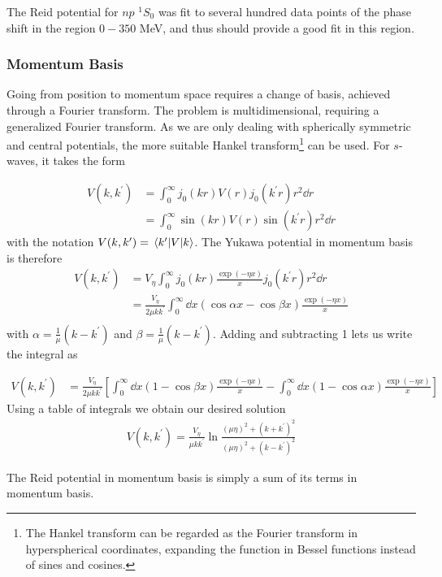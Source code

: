 The Reid potential for \(np\) \(^{1}S_{0}\) was fit to several hundred data points
of the phase shift in the region \(0-350\) MeV, and thus should provide a good
fit in this region\cite{reid}.

\subsubsection{Momentum Basis}

Going from position to momentum space requires a change of basis, achieved
through a Fourier transform. The problem is multidimensional, requiring a
generalized Fourier transform. As we are only dealing with spherically symmetric
 and central potentials, the more suitable Hankel transform\footnote{The Hankel
   transform can be regarded as the Fourier transform in hyperspherical coordinates, expanding the function in
 Bessel functions instead of sines and cosines. } can be used. For
 \(s\)-waves, it takes the form

\newcommand{\kp}{k^{\prime}}
\begin{align*}
  V(k, \kp{}) &= \int_{0}^{\infty}j_{0}(kr)V(r)j_{0}(k^{\prime}r)r^{2}\dd r\\
  &=  \int_{0}^{\infty}\sin(kr)V(r)\sin(k^{\prime}r)r^{2}\dd r
\end{align*}
with the notation \(V(k, \kp{}) = \mel{\kp{}}{V}{k}\). The Yukawa potential in
momentum basis is therefore
\begin{align*}
  V(k, \kp{}) &= V_{\eta} \int_{0}^{\infty}j_{0}(kr)\frac{\exp(-\eta x)}{x}j_{0}(k^{\prime}r)r^{2}\dd r\\
              &= \frac{V_{\eta}}{2\mu k\kp{}} \int_{0}^{\infty}\dd x \left( \cos{\alpha x}-\cos{\beta x} \right)\frac{\exp(-\eta x)}{x}\\
  \end{align*}
 with \(\alpha=\frac{1}{\mu}\left( k-k^{\prime} \right)\) and \(\beta =
 \frac{1}{\mu}\left( k-k^{\prime} \right)\). Adding and subtracting 1 lets us
 write the integral as

\begin{align*}
  V(k, \kp{}) &= \frac{V_{\eta}}{2\mu k\kp{}} \left[ \int_{0}^{\infty}\dd x \left( 1-\cos{\beta x} \right)\frac{\exp(-\eta x)}{x}
                - \int_{0}^{\infty}\dd x \left(1-\cos\alpha x\right) \frac{\exp(-\eta x)}{x}\right]
\end{align*}
Using a table of integrals we obtain our desired solution
\begin{align*}
  V(k, \kp{}) = \frac{V_{\eta}}{\mu k \kp{}} \ln \frac{(\mu\eta)^{2}+(k+k^{\prime})^{2}}{(\mu\eta)^{2}+(k-k^{\prime})^{2}}
\end{align*}

The Reid potential in momentum basis is simply a sum of its terms in momentum basis.




